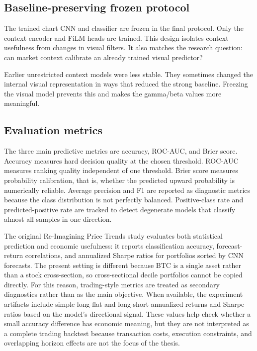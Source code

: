 \documentclass[14pt,a4paper]{extarticle}
\begin{document}
\subsection{Baseline-preserving frozen protocol}

The trained chart CNN and classifier are frozen in the final protocol. Only the context encoder and FiLM heads are trained. This design isolates context usefulness from changes in visual filters. It also matches the research question: can market context calibrate an already trained visual predictor?

Earlier unrestricted context models were less stable. They sometimes changed the internal visual representation in ways that reduced the strong baseline. Freezing the visual model prevents this and makes the gamma/beta values more meaningful.

\subsection{Evaluation metrics}

The three main predictive metrics are accuracy, ROC-AUC, and Brier score. Accuracy measures hard decision quality at the chosen threshold. ROC-AUC measures ranking quality independent of one threshold. Brier score measures probability calibration, that is, whether the predicted upward probability is numerically reliable. Average precision and F1 are reported as diagnostic metrics because the class distribution is not perfectly balanced. Positive-class rate and predicted-positive rate are tracked to detect degenerate models that classify almost all samples in one direction.

The original Re-Imagining Price Trends study evaluates both statistical prediction and economic usefulness: it reports classification accuracy, forecast-return correlations, and annualized Sharpe ratios for portfolios sorted by CNN forecasts. The present setting is different because BTC is a single asset rather than a stock cross-section, so cross-sectional decile portfolios cannot be copied directly. For this reason, trading-style metrics are treated as secondary diagnostics rather than as the main objective. When available, the experiment artifacts include simple long-flat and long-short annualized returns and Sharpe ratios based on the model's directional signal. These values help check whether a small accuracy difference has economic meaning, but they are not interpreted as a complete trading backtest because transaction costs, execution constraints, and overlapping horizon effects are not the focus of the thesis.
\end{document}
